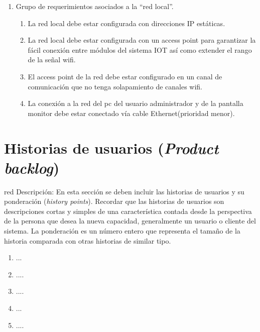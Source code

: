 \documentclass[11pt]{charter}
\begin{document}
\begin{enumerate}
\begin{enumerate}
	\item El módulo debe leer cada 1 segundos los datos que se le envían desde el módulo principal.
	\item El módulo debe tener configurado los credenciales necesarios para unirse a la red local mediante Wifi.
	\item El módulo debe estar funcionando 24/7.
	\item El módulo deberá estar conectado a un ventilador y actuara mediante un relé para su encendido o apagado del mismo.
	\item El módulo debe tener un case para protección de sus componentes internos y para su mejor presentación(prioridad menor)
	\end{enumerate}

\item Grupo de requerimientos asociados a la ``red local''.
	\begin{enumerate}
	\item La red local debe estar configurada con direcciones IP estáticas.
	\item La red local debe estar configurada con un access point para garantizar la fácil conexión entre módulos del sistema IOT así como extender el rango de la señal wifi.
	\item El access point de la red debe estar configurado en un canal de comunicación que no tenga solapamiento de canales wifi.
	\item La conexión a la red del pc del usuario administrador y de la pantalla monitor debe estar conectado vía cable Ethernet(prioridad menor).
	\end{enumerate}

\end{enumerate}

\section{Historias de usuarios (\textit{Product backlog})}
\label{sec:backlog}

\begin{consigna}{red}
Descripción: En esta sección se deben incluir las historias de usuarios y su ponderación (\textit{history points}). Recordar que las historias de usuarios son descripciones cortas y simples de una característica contada desde la perspectiva de la persona que desea la nueva capacidad, generalmente un usuario o cliente del sistema. La ponderación es un número entero que representa el tamaño de la historia comparada con otras historias de similar tipo.

\begin{enumerate}
\item ...
\item ....
\item ....
\item ...
\item ....

\end{enumerate}

\end{consigna}
\end{document}

